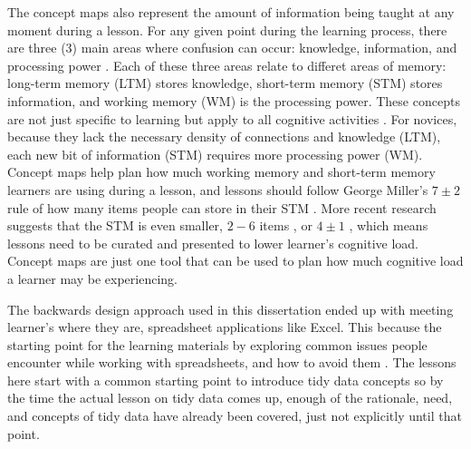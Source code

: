 \documentclass[010-intro.tex]{subfiles}
\begin{document}
        The concept maps also represent the amount of information being taught at any moment during a lesson.
        For any given point during the learning process,
        there are three (3) main areas where confusion can occur:
        knowledge, information, and processing power \cite{hermansProgrammerBrain2021}.
        Each of these three areas relate to differet areas of memory:
        long-term memory (LTM) stores knowledge,
        short-term memory (STM) stores information, and
        working memory (WM) is the processing power.
        These concepts are not just specific to learning but apply to all cognitive activities
        \cite{hermansProgrammerBrain2021}.
        For novices, because they lack the necessary density of connections and knowledge (LTM),
        each new bit of information (STM) requires more processing power (WM).
        Concept maps help plan how much working memory and short-term memory learners are using during a lesson,
        and lessons should follow George Miller's $7\pm2$ rule of how many items people can store in their STM
        \cite{miller1956magical}.
        More recent research suggests that the STM is even smaller, $2-6$ items
        \cite{hermansProgrammerBrain2021},
        or $4\pm1$ \cite{didauWhatEveryTeacher2016},
        which means lessons need to be curated and presented to lower learner's cognitive load.
        Concept maps are just one tool that can be used to plan how much cognitive load a learner may be experiencing.

        The backwards design approach used in this dissertation ended up with meeting learner's where they are,
        spreadsheet applications like Excel.
        This because the starting point for the learning materials by exploring common issues people encounter while
        working with spreadsheets, and how to avoid them
        \cite{bromanDataOrganizationSpreadsheets2018}.
        The lessons here start with a common starting point to introduce tidy data concepts so by
        the time the actual lesson on tidy data comes up,
        enough of the rationale, need, and concepts of tidy data have already been covered,
        just not explicitly until that point.
\end{document}
